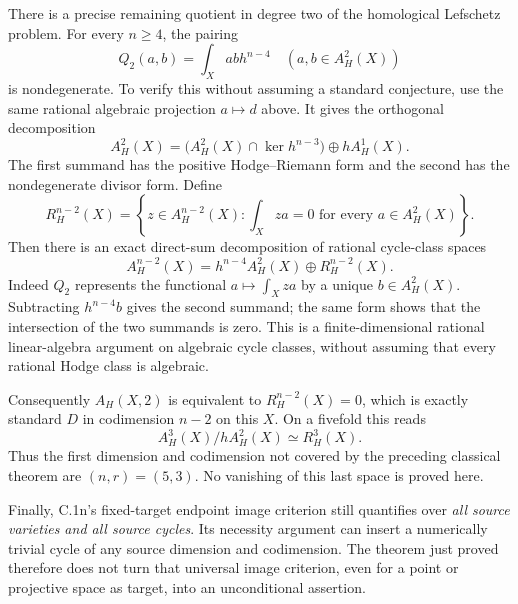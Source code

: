 There is a precise remaining quotient in degree two of the
homological Lefschetz problem. For every $n\ge4$, the pairing
\[
       Q_2(a,b)=\int_X abh^{n-4}
                  \quad(a,b\in A_H^2(X))
\]
is nondegenerate. To verify this without assuming a standard
conjecture, use the same rational algebraic projection
$a\mapsto d$ above. It gives the orthogonal decomposition
\[
 A_H^2(X)=
 \bigl(A_H^2(X)\cap\ker h^{n-3}\bigr)\oplus hA_H^1(X).
\]
The first summand has the positive Hodge--Riemann form and
the second has the nondegenerate divisor form. Define
\[
 R_H^{n-2}(X)=
 \left\{z\in A_H^{n-2}(X):
       \int_X za=0\text{ for every }a\in A_H^2(X)\right\}.
\]
Then there is an exact direct-sum decomposition of rational
cycle-class spaces
\begin{equation}\label{eq:C2k-first-obstruction}
 A_H^{n-2}(X)=h^{n-4}A_H^2(X)\oplus R_H^{n-2}(X).
\end{equation}
Indeed $Q_2$ represents the functional $a\mapsto\int_X za$
by a unique $b\in A_H^2(X)$. Subtracting $h^{n-4}b$ gives the
second summand; the same form shows that the intersection
of the two summands is zero. This is a finite-dimensional
rational linear-algebra argument on algebraic cycle classes,
without assuming that every rational Hodge class is algebraic.

Consequently $A_H(X,2)$ is equivalent to
$R_H^{n-2}(X)=0$, which is exactly standard $D$ in
codimension $n-2$ on this $X$. On a fivefold this reads
\[
 A_H^3(X)/hA_H^2(X)\simeq R_H^3(X).
\]
Thus the first dimension and codimension not covered by
the preceding classical theorem are $(n,r)=(5,3)$.
No vanishing of this last space is proved here.

Finally, C.1n's fixed-target endpoint image criterion still
quantifies over \emph{all source varieties and all source
cycles}. Its necessity argument can insert a numerically
trivial cycle of any source dimension and codimension.
The theorem just proved therefore does not turn that
universal image criterion, even for a point or projective
space as target, into an unconditional assertion.
